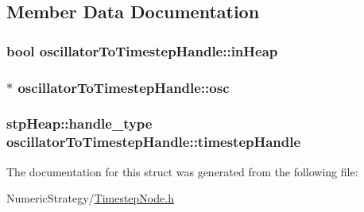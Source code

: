 \subsection{Member Data Documentation}
\hypertarget{structoscillator_to_timestep_handle_a93851e264ab8e6f9c9b8a725bd33984b}{
\subsubsection[{in\+Heap}]{\setlength{\rightskip}{0pt plus 5cm}bool oscillator\+To\+Timestep\+Handle\+::in\+Heap}}\label{structoscillator_to_timestep_handle_a93851e264ab8e6f9c9b8a725bd33984b}
\hypertarget{structoscillator_to_timestep_handle_ad8b716b7b0519689a5267f9c5875e055}{
\subsubsection[{osc}]{$\ast$ oscillator\+To\+Timestep\+Handle\+::osc}}\label{structoscillator_to_timestep_handle_ad8b716b7b0519689a5267f9c5875e055}
\hypertarget{structoscillator_to_timestep_handle_aa4d736d3a931e47677113c16052c2713}{
\subsubsection[{timestep\+Handle}]{\setlength{\rightskip}{0pt plus 5cm}stp\+Heap\+::handle\+\_\+type oscillator\+To\+Timestep\+Handle\+::timestep\+Handle}}\label{structoscillator_to_timestep_handle_aa4d736d3a931e47677113c16052c2713}


The documentation for this struct was generated from the following file\+:\begin{DoxyCompactItemize}
\item 
Numeric\+Strategy/\hyperlink{_timestep_node_8h}{Timestep\+Node.\+h}\end{DoxyCompactItemize}
